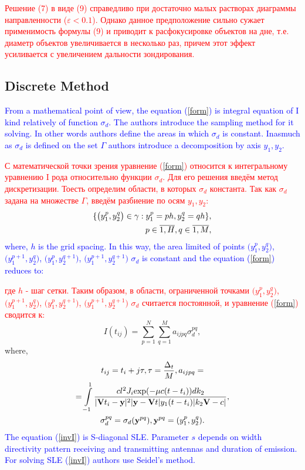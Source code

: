 \documentclass{procDDs}
\begin{document}
\textcolor{red}{Решение (7) в виде (9) справедливо при достаточно малых растворах диаграммы направленности ($\varepsilon<0.1$). Однако данное предположение сильно сужает применимость формулы (9) и приводит к расфокусировке объектов на дне, т.е. диаметр объектов увеличивается в несколько раз, причем этот эффект усиливается с увеличением дальности зондирования.}

\subsection{Discrete Method}
\textcolor{blue}{From a mathematical point of view, the equation (\ref{form}) is integral equation of I kind relatively of function $\sigma_d$. The authors introduce the sampling method for it solving. In other words authors define the areas in which $\sigma_d$ is constant. Inasmuch as $\sigma_d$ is defined on the set $\Gamma$ authors introduce a decomposition by axis $y_1, y_2$.}

\textcolor{red}{С математической точки зрения уравнение (\ref{form}) относится к интегральному уравнению I рода относительно функции $\sigma_d$. Для его решения введём метод дискретизации. Тоесть определим области, в которых $\sigma_d$  константа. Так как $\sigma_d$ задана на множестве $\Gamma$, введём разбиение по осям $y_1, y_2$:}
\begin{align}
	\{ \big( y_1^p, y_2^q \big) \in\gamma: y_1^p = ph, y_2^q = qh \}, \notag \\ 
	p \in \overline{1, H}, q \in \overline{1, M}, 
\end{align}
\textcolor{blue}{
where, $h$ is the grid spacing. In this way, the area limited of points $\big(y_1^p, y_2^q\big)$, $\big(y_1^{p+1}, y_2^q\big)$, $\big(y_1^p, y_2^{q+1}\big)$, $\big(y_1^{p+1}, y_2^{q+1}\big)$ $\sigma_d$  is constant and the equation (\ref{form}) reduces to:}

\textcolor{red}{где $h$ - шаг сетки. Таким образом, в области, ограниченной точками $\big(y_1^p, y_2^q\big)$, $\big(y_1^{p+1}, y_2^q\big)$, $\big(y_1^p, y_2^{q+1}\big)$, $\big(y_1^{p+1}, y_2^{q+1}\big)$ $\sigma_d$ считается постоянной, и уравнение (\ref{form}) сводится к:}
\begin{equation}
\label{invI}
	I(t_{ij}) = \sum \limits_{p=1}^{N} \sum \limits_{q=1}^{M} a_{ijpq}\sigma_d^{pq},
\end{equation}
where,
\begin{multline*}
t_{ij} = t_i+j\tau, \tau = \frac{\Delta_t}{M}, a_{ijpq} = \\ 
=  \int\limits_{-1}^{1}
\frac{cl^2J_i \text{exp}(-\mu c(t-t_i))dk_2}{|\mathbf{V}t_i-\mathbf{y}|^2|\mathbf{y}-\mathbf{V}t|y_1(t-t_i)|k_2 \mathbf{V}-c|}, \\
\sigma_d^{pq} = \sigma_d(\textbf{y}^{pq}), \textbf{y}^{pq} = (y_1^p, y_2^q).
\end{multline*}
\textcolor{blue}{The equation (\ref{invI}) is S-diagonal SLE. Parameter $s$ depends on width directivity pattern receiving and transmitting antennas and duration of emission. For solving SLE (\ref{invI}) authors use  Seidel's method.}
\end{document}

